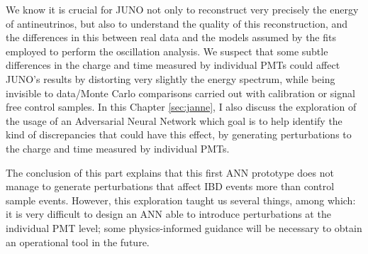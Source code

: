 \documentclass[../main.tex]{subfiles}
\begin{document}
We know it is crucial for JUNO not only to reconstruct very precisely the energy of antineutrinos, but also to understand the quality of this reconstruction, and the differences in this between real data and the models assumed by the fits employed to perform the oscillation analysis. We suspect that some subtle differences in the charge and time measured by individual PMTs could affect JUNO's results by distorting very slightly the energy spectrum, while being invisible to data/Monte Carlo comparisons carried out with calibration or signal free control samples. In this Chapter \ref{sec:janne}, I also discuss the exploration of the usage of an Adversarial Neural Network which goal is to help identify the kind of discrepancies that could have this effect, by generating perturbations
to the charge and time measured by individual PMTs.

The conclusion of this part explains that this first ANN prototype does not manage to generate perturbations that affect IBD events more than control sample events.  However, this exploration taught us several things, among which: it is very difficult to design an ANN able to introduce perturbations at the individual PMT level; some physics-informed guidance will be necessary to obtain an operational tool in the future.

\hfill

%
%
%
\end{document}

